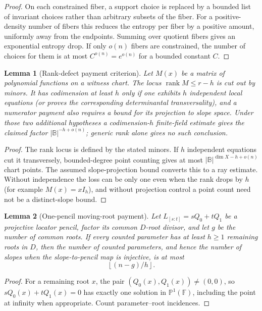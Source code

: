 \documentclass[12pt,a4paper]{amsart}
\numberwithin{equation}{section}
\newtheorem{lemma}[lemma]{Lemma}
\theoremstyle{remark}
\DeclareMathOperator{\rank}{rank}
\newcommand{\F}{\mathbb F}
\newcommand{\B}{\mathbb B}
\newcommand{\Pj}{\mathbb P}
\newcommand{\abs}[1]{\lvert #1\rvert}
\newcommand{\floor}[1]{\left\lfloor #1\right\rfloor}
\begin{document}
\begin{proof}
On each constrained fiber, a support choice is replaced by a bounded list of invariant choices rather than arbitrary subsets of the fiber.  For a positive-density number of fibers this reduces the entropy per fiber by a positive amount, uniformly away from the endpoints.  Summing over quotient fibers gives an exponential entropy drop.  If only \(o(n)\) fibers are constrained, the number of choices for them is at most \(C^{o(n)}=e^{o(n)}\) for a bounded constant \(C\).
\end{proof}

\begin{lemma}[Rank-defect payment criterion]\label{lem:rank-defect-payment}
Let \(M(x)\) be a matrix of polynomial functions on a witness chart.  The
locus \(\rank M\le r-h\) is cut out by minors.  It has codimension at least
\(h\) only if one exhibits \(h\) independent local equations (or proves
the corresponding determinantal transversality), and a numerator payment
also requires a bound for its projection to slope space.  Under those two
additional hypotheses a codimension-\(h\) finite-field estimate gives the
claimed factor \(\abs\B^{-h+o(n)}\); generic rank alone gives no such
conclusion.
\end{lemma}

\begin{proof}
The rank locus is defined by the stated minors.  If \(h\) independent
equations cut it transversely, bounded-degree point counting gives at most
\(\abs\B^{\dim X-h+o(n)}\) chart points.  The assumed slope-projection
bound converts this to a ray estimate.  Without independence the loss can
be only one even when the rank drops by \(h\) (for example
\(M(x)=xI_h\)), and without projection control a point count need not be a
distinct-slope bound.
\end{proof}

\begin{lemma}[One-pencil moving-root payment]\label{lem:pencil-payment}
Let \(L_{[s:t]}=sQ_0+tQ_1\) be a projective locator pencil, factor its
common \(D\)-root divisor, and let \(g\) be the number of common roots.  If
every counted parameter has at least \(h\ge1\) remaining roots in \(D\),
then the number of counted parameters, and hence the number of slopes when
the slope-to-pencil map is injective, is at most
\[
             \floor{(n-g)/h}.
\]
\end{lemma}

\begin{proof}
For a remaining root \(x\), the pair
\((Q_0(x),Q_1(x))\ne(0,0)\), so
\(sQ_0(x)+tQ_1(x)=0\) has exactly one solution in
\(\Pj^1(\F)\), including the point at infinity when appropriate.  Count
parameter--root incidences.
\end{proof}
\end{document}
